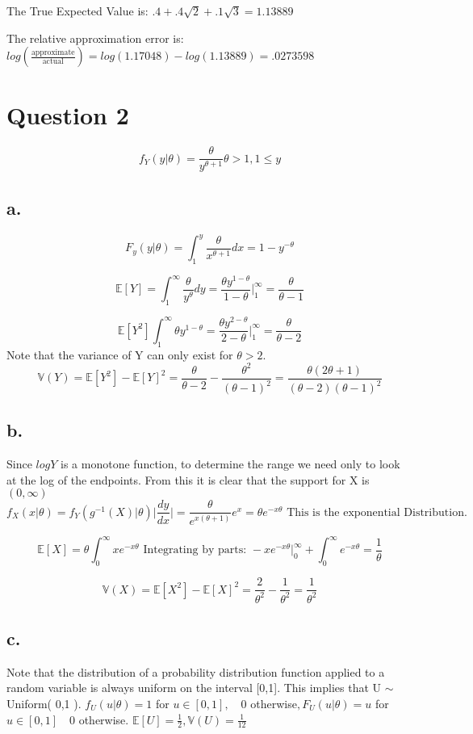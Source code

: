 \documentclass{paper}
\begin{document}
The True Expected Value is: $.4 + .4 \sqrt{2} + .1 \sqrt{3} = 1.13889$
 
The relative approximation error is: $log( \frac{\text{approximate} }{\text{actual}}) = log( 1.17048 ) - log( 1.13889) =  .0273598$

\section*{Question 2}

$$f_Y (y | \theta ) = \frac{ \theta } { y^{ \theta + 1 } } \theta > 1, 1 \leq y$$
\subsection*{a.}

$$F_y ( y | \theta ) = \int_{1}^{y} \frac{ \theta } { x^{ \theta + 1 } } dx = 1 - y^{-\theta}$$

$$\mathbb{E}[Y] = \int_{1}^{\infty} \frac{ \theta } { y^\theta } dy = \frac{ \theta y^{1 - \theta }}{1 -\theta } \big |_{1}^{\infty} = \frac{ \theta } { \theta - 1 }$$

$$\mathbb{E}[Y^2] \int_{1}^{\infty} \theta y^{1-\theta} = \frac{ \theta y^{ 2 - \theta }}{2 - \theta} \big |_1^\infty = \frac{ \theta }{ \theta - 2 } $$
Note that the variance of Y can only exist for $\theta > 2$. 
$$\mathbb{V}(Y) = \mathbb{E}[Y^2] - \mathbb{E}[Y]^2 = \frac{\theta}{\theta - 2}- \frac{\theta^2}{(\theta-1)^2} = \frac{ \theta ( 2\theta + 1 )}{ (\theta - 2)( \theta - 1 )^2 }$$

\subsection*{b.}
Since $logY$ is a monotone function, to determine the range we need only to look at the log of the endpoints. From this it is clear that the support for X is $(0,\infty)$
$$f_X (x | \theta ) = f_Y ( g^{-1} ( X ) | \theta ) \big | \frac{ dy }{dx} \big | = \frac{ \theta }{e^{x( \theta  + 1 )} } e^x = \theta e^{-x \theta } \text{          This is the exponential Distribution.}$$

$$\mathbb{E}[X] = \theta \int_0^\infty x e^{-x \theta } \text{ Integrating by parts: } -x e^{-x \theta } \big |_0^\infty + \int_0^\infty e^{-x \theta } = \frac{1}{\theta}$$

$$\mathbb{V}(X) = \mathbb{E}[X^2] - \mathbb{E}[X]^2 = \frac{2}{\theta^2} - \frac{ 1}{\theta^2} = \frac{ 1 }{\theta^2}$$

\subsection*{c.}
Note that the distribution of a probability distribution function applied to a random variable is always uniform on the interval [0,1]. This implies that U $\sim$ Uniform( 0,1 ).
$f_U ( u | \theta ) = 1$ for $u \in [0,1],\quad  0 $ otherwise$, F_U (u| \theta ) = u$ for $u \in [0,1] \quad 0 $ otherwise. $\mathbb{E}[U] = \frac{1}{2}, \mathbb{V}(U) = \frac{1}{12}$
\end{document}
